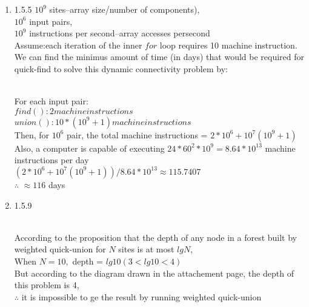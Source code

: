\documentclass[11pt]{article}
\begin{document}
\begin{enumerate}
\item 1.5.5
$10^9$ sites--array size/number of components),\\ 
$10^6$ input pairs, \\
$10^9$ instructions per second--array accesses persecond\\
Assume:each iteration of the inner $for$ loop requires 10 machine instruction.\\
We can find the minimus amount of time (in days) that would be required for quick-find to solve this dynamic connectivity problem by: \\
\begin{solution}\\
For each input pair:\\
$find(): 2 machine instructions$ \\
$union(): 10 * (10^9 +1) machine instructions$\\
Then, for $10^6$ pair, the total machine instructions = $2*10^6 + 10^7(10^9 +1)$\\
Also, a computer is capable of executing $24 * 60^2 * 10^9 = 8.64*10^13$ machine instructions per day\\
 $(2*10^6 + 10^7(10^9 +1)) / 8.64*10^13 \approx 115.7407$\\
$\therefore$ $\approx 116$ days 

\end{solution}

\item 1.5.9
\begin{solution}\\
According to the proposition that the depth of any node in a forest built by weighted quick-union for $N$ sites is at most $lgN$, \\
When $N= 10,$ depth = $lg10 (3<lg10<4)$\\
But according to the diagram drawn in the attachement page, the depth of this problem is 4,\\
$\therefore$ it is impossible to ge the result by running weighted quick-union 

\end{solution}

\end{enumerate}
\end{document}
